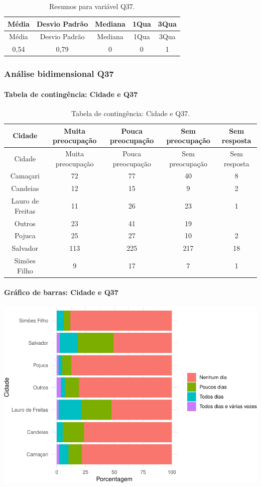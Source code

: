 \documentclass[]{article}
\let\oldparagraph\paragraph
\renewcommand{\paragraph}[1]{\oldparagraph{#1}\mbox{}}
\begin{document}
\begin{longtable}[]{@{}ccccc@{}}
\caption{\label{tab:unnamed-chunk-1369}Resumos para variável Q37.}\tabularnewline
\toprule
Média & Desvio Padrão & Mediana & 1Qua & 3Qua\tabularnewline
\midrule
\endfirsthead
\toprule
Média & Desvio Padrão & Mediana & 1Qua & 3Qua\tabularnewline
\midrule
\endhead
0,54 & 0,79 & 0 & 0 & 1\tabularnewline
\bottomrule
\end{longtable}

\cleardoublepage

\hypertarget{anuxe1lise-bidimensional-q37}{%
\subsubsection{Análise bidimensional Q37}\label{anuxe1lise-bidimensional-q37}}

\hypertarget{tabela-de-continguxeancia-cidade-e-q37}{%
\paragraph{Tabela de contingência: Cidade e Q37}\label{tabela-de-continguxeancia-cidade-e-q37}}

\begin{longtable}[]{@{}ccccc@{}}
\caption{\label{tab:unnamed-chunk-1370}Tabela de contingência: Cidade e Q37.}\tabularnewline
\toprule
Cidade & Muita preocupação & Pouca preocupação & Sem preocupação & Sem resposta\tabularnewline
\midrule
\endfirsthead
\toprule
Cidade & Muita preocupação & Pouca preocupação & Sem preocupação & Sem resposta\tabularnewline
\midrule
\endhead
Camaçari & 72 & 77 & 40 & 8\tabularnewline
Candeias & 12 & 15 & 9 & 2\tabularnewline
Lauro de Freitas & 11 & 26 & 23 & 1\tabularnewline
Outros & 23 & 41 & 19 &\tabularnewline
Pojuca & 25 & 27 & 10 & 2\tabularnewline
Salvador & 113 & 225 & 217 & 18\tabularnewline
Simões Filho & 9 & 17 & 7 & 1\tabularnewline
\bottomrule
\end{longtable}

\hypertarget{gruxe1fico-de-barras-cidade-e-q37}{%
\paragraph{Gráfico de barras: Cidade e Q37}\label{gruxe1fico-de-barras-cidade-e-q37}}

\begin{center}\includegraphics[width=0.75\linewidth]{relatorio_covid19_files/figure-latex/unnamed-chunk-1371-1} \end{center}
\end{document}
